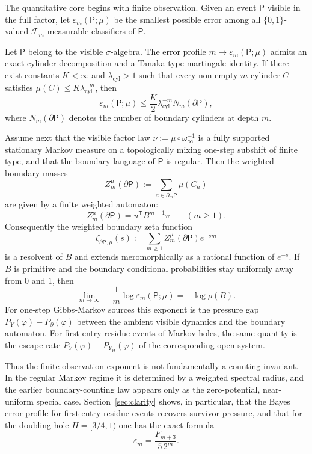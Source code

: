 The quantitative core begins with finite observation.  Given an event
\(\mathsf{P}\) visible in the full factor, let
\(\varepsilon_m(\mathsf{P};\mu)\) be the smallest possible error among
all \(\{0,1\}\)-valued \(\mathcal{F}_m\)-measurable classifiers of
\(\mathsf{P}\).

\begin{theorem}
\label{thm:main-clarity}
Let \(\mathsf{P}\) belong to the visible \(\sigma\)-algebra.  The error
profile \(m\mapsto \varepsilon_m(\mathsf{P};\mu)\) admits an exact
cylinder decomposition and a Tanaka-type martingale identity.  If there
exist constants \(K<\infty\) and \(\lambda_{\mathrm{cyl}}>1\) such that
every non-empty \(m\)-cylinder \(C\) satisfies
\(\mu(C)\leq K\lambda_{\mathrm{cyl}}^{-m}\), then
\[
  \varepsilon_m(\mathsf{P};\mu)
  \leq \frac{K}{2}\lambda_{\mathrm{cyl}}^{-m}
     N_m(\partial\mathsf{P}),
\]
where \(N_m(\partial\mathsf{P})\) denotes the number of boundary
cylinders at depth \(m\).

Assume next that the visible factor law
\(\nu:=\mu\circ\omega_\infty^{-1}\) is a fully supported stationary
Markov measure on a topologically mixing one-step subshift of finite
type, and that the boundary language of \(\mathsf{P}\) is regular.
Then the weighted boundary masses
\[
  Z_m^\mu(\partial\mathsf{P})
  := \sum_{a\in\partial_m\mathsf{P}}\mu(C_a)
\]
are given by a finite weighted automaton:
\[
  Z_m^\mu(\partial\mathsf{P}) = u^{\mathsf T}B^{m-1}v
  \qquad (m\geq 1).
\]
Consequently the weighted boundary zeta function
\[
  \zeta_{\partial\mathsf{P},\mu}(s)
  := \sum_{m\geq 1}
      Z_m^\mu(\partial\mathsf{P})e^{-sm}
\]
is a resolvent of \(B\) and extends meromorphically as a rational
function of \(e^{-s}\).  If \(B\) is primitive and the boundary
conditional probabilities stay uniformly away from \(0\) and \(1\),
then
\[
  \lim_{m\to\infty}
  -\frac{1}{m}\log \varepsilon_m(\mathsf{P};\mu)
  = -\log\rho(B).
\]
For one-step Gibbs-Markov sources this exponent is the pressure gap
\(P_Y(\varphi)-P_\partial(\varphi)\) between the ambient visible
dynamics and the boundary automaton.  For first-entry residue events of
Markov holes, the same quantity is the escape rate
\(P_Y(\varphi)-P_{Y_H}(\varphi)\) of the corresponding open system.
\end{theorem}

Thus the finite-observation exponent is not fundamentally a counting
invariant.  In the regular Markov regime it is determined by a weighted
spectral radius, and the earlier boundary-counting law appears only as
the zero-potential, near-uniform special case.  Section~\ref{sec:clarity}
shows, in particular, that the Bayes error profile for first-entry
residue events recovers survivor pressure, and that for the doubling
hole \(H=[3/4,1)\) one has the exact formula
\[
  \varepsilon_m=\frac{F_{m+3}}{5\,2^m}.
\]

